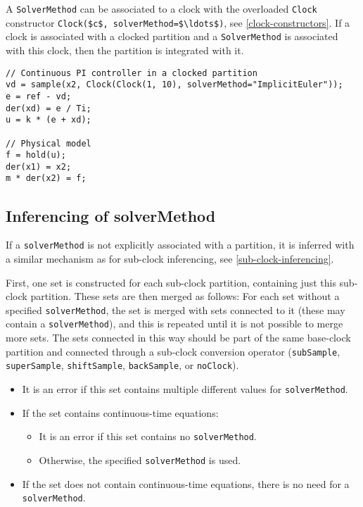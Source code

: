A \lstinline!SolverMethod! can be associated to a clock with the overloaded \lstinline!Clock! constructor \lstinline!Clock($c$, solverMethod=$\ldots$)!, see \cref{clock-constructors}.
If a clock is associated with a clocked partition and a \lstinline!SolverMethod! is associated with this clock, then the partition is integrated with it.

\begin{example}
\begin{lstlisting}[language=modelica]
// Continuous PI controller in a clocked partition
vd = sample(x2, Clock(Clock(1, 10), solverMethod="ImplicitEuler"));
e = ref - vd;
der(xd) = e / Ti;
u = k * (e + xd);

// Physical model
f = hold(u);
der(x1) = x2;
m * der(x2) = f;
\end{lstlisting}
\end{example}

\subsection{Inferencing of solverMethod}\label{inferencing-of-solvermethod}

If a \lstinline!solverMethod! is not explicitly associated with a partition, it is inferred with a similar mechanism as for sub-clock inferencing, see \cref{sub-clock-inferencing}.

First, one set is constructed for each sub-clock partition, containing just this sub-clock partition.
These sets are then merged as follows:
For each set without a specified \lstinline!solverMethod!, the set is merged with sets connected to it (these may contain a \lstinline!solverMethod!), and this is repeated until it is not possible to merge more sets.
The sets connected in this way should be part of the same base-clock partition and connected through a sub-clock conversion operator (\lstinline!subSample!, \lstinline!superSample!, \lstinline!shiftSample!, \lstinline!backSample!, or \lstinline!noClock!).

\begin{itemize}
\item It is an error if this set contains multiple different values for \lstinline!solverMethod!.
\item If the set contains continuous-time equations:
\begin{itemize}
\item It is an error if this set contains no \lstinline!solverMethod!.
\item Otherwise, the specified \lstinline!solverMethod! is used.
\end{itemize}
\item If the set does not contain continuous-time equations, there is no need for a \lstinline!solverMethod!.
\end{itemize}

